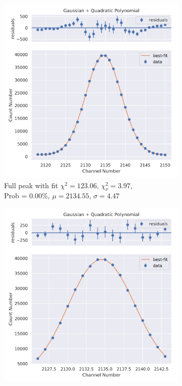 \documentclass[11pt,a4paper]{article}
\begin{document}
\begin{figure}[H]
  \centering
  \begin{subfigure}{.5\linewidth}
    \centering
    \includegraphics[width=\linewidth]{./Images/Barium133/Quad/Quad_5_Full.png}
    \caption{Full peak with fit $\chi^2 = 123.06$, $\chi^2_\nu = 3.97$, \\ Prob = 0.00\%, $\mu = 2134.55$, $\sigma = 4.47$}
  \end{subfigure}%
  \begin{subfigure}{.5\linewidth}
    \centering
    \includegraphics[width=\linewidth]{./Images/Barium133/Quad/Quad_5_Zoom.png}

\end{subfigure}
\end{figure}
\end{document}
